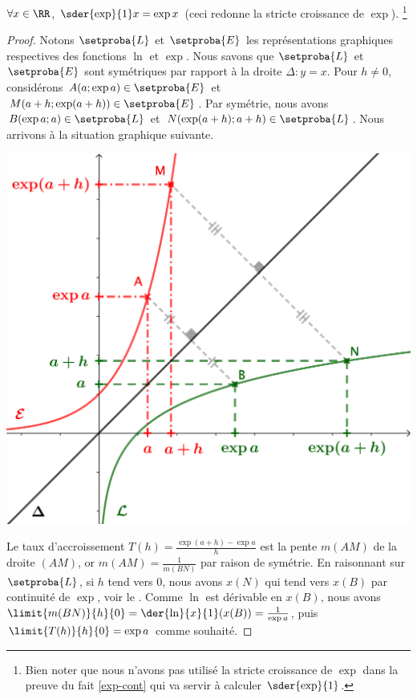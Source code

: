 

\begin{fact}
    $\forall x \in \RR$,
    $\sder{\exp}{1} x = \exp x$
    (ceci redonne la stricte croissance de $\exp$).%
    \footnote{
        Bien noter que nous n'avons pas utilisé la stricte croissance de $\exp$ dans la preuve du fait \ref{exp-cont} qui va servir à calculer $\sder{\exp}{1}$.
    }
\end{fact}


\begin{proof}
    Notons $\setproba{L}$ et $\setproba{E}$ les représentations graphiques respectives des fonctions $\ln$ et $\exp$.
    Nous savons que $\setproba{L}$ et $\setproba{E}$ sont symétriques par rapport à la droite $\Delta: y = x$.
    Pour $h \neq 0$, considérons
    $A(a ; \exp a) \in \setproba{E}$ et $M(a+h ; \exp(a+h)) \in \setproba{E}$.
    Par symétrie, nous avons
    $B(\exp a ; a) \in \setproba{L}$ et $N(\exp(a+h) ; a+h) \in \setproba{L}$.
    Nous arrivons à la situation graphique suivante.

    \begin{center}
        \includegraphics[scale=.85]{content/exp/eq-diff.png}
    \end{center}

    Le taux d'accroissement $T(h) = \frac{\exp(a+h) - \exp a}{h}$ est la pente $m(AM)$ de la droite $(AM)$, or $m(AM) = \frac{1}{m(BN)}$ par raison de symétrie.
    En raisonnant sur $\setproba{L}$, si $h$ tend vers $0$, nous avons $x(N)$ qui tend vers $x(B)$ par continuité de $\exp$, voir le .
    Comme $\ln$ est dérivable en $x(B)$, nous avons
    $\limit{m(BN)}{h}{0} = \der{\ln}{x}{1}(x(B)) = \frac{1}{\exp a}$,
    puis
    $\limit{T(h)}{h}{0} = \exp a$
    comme souhaité.
\end{proof}
